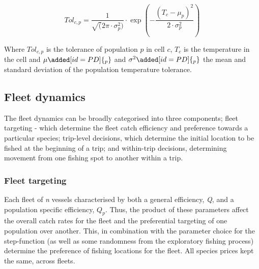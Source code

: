 \documentclass[review]{elsarticle}
\begin{document}
\begin{equation}
	Tol_{c, p} = \frac{1}{ \sqrt (2\pi \cdot \sigma^2_{p})} \cdot \exp(-
		\frac{(T_{c} -
		\mu_{p})^2}{2 \cdot \sigma^2_{p}} )	
\end{equation}

Where $Tol_{c,p}$ is the tolerance of population $p$ in cell $c$, $T_{c}$ is
the temperature in the cell and $\mu\added[id=PD]{_{p}}$ and
$\sigma^2\added[id=PD]{_{p}}$ the mean and standard deviation of the population
temperature tolerance. \\


\subsection{Fleet dynamics}

The fleet dynamics can be broadly categorised into three components; fleet
targeting - which determine the fleet catch efficiency
and preference towards a particular species; trip-level decisions, which
determine the initial location to be fished at the beginning of
a trip; and within-trip decisions, determining movement from one fishing spot
to another within a trip.

\subsubsection{Fleet targeting}

Each fleet of \textit{n} vessels  characterised by
both a general efficiency, \textit{Q}, and a population specific efficiency,
${Q_{p}}$.  Thus, the product of these parameters affect
the overall catch rates for the fleet and the preferential targeting of one
population over another. This, in combination with the parameter choice for the
step-function  (as well as some randomness from the
exploratory fishing process) determine the preference of
fishing locations for the fleet.  All species prices
 kept the same, across fleets.  
\end{document}
